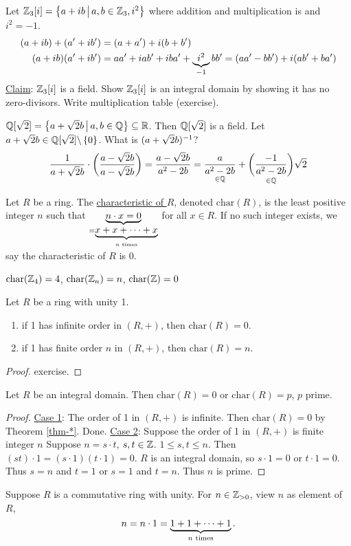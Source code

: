 \documentclass[]{article}
\begin{document}
\begin{example}
	Let $\mb Z_3[i]=\setm{a+ib}{a,b\in\mb Z_3,i^2}$ where addition and multiplication is  and $i^2=-1$.
	\begin{align*}
		(a+ib)+(a'+ib') &= (a+a')+i(b+b') \\
		(a+ib)(a'+ib') &= aa'+iab'+iba'+\ub{-1}{i^2}bb' = (aa'-bb')+i(ab'+ba')
	\end{align*}
	\ul{Claim}: $\mb Z_3[i]$ is a field.
	Show $\mb Z_3[i]$ is an integral domain by showing it has no zero-divisors. Write multiplication table (exercise).
\end{example}
\begin{example}
	$\mb Q[\sqrt2] = \setm{a+\sqrt2b}{a,b\in\mb Q}\subseteq\mb R$.
	Then $\mb Q[\sqrt2]$ is a field.
	Let $a+\sqrt2b\in\mb Q[\sqrt2]\bs\set0$. What is $(a+\sqrt2b)\inv$?
	$$ \frac1{a+\sqrt2b}\cdot\plr{\frac{a-\sqrt2b}{a-\sqrt2b}} = \frac{a-\sqrt2b}{a^2-2b} = \us{\in\mb Q}{\frac a{a^2-2b}} + \us{\in\mb Q}{\plr{\frac{-1}{a^2-2b}}}\sqrt2 $$
\end{example}
\begin{definition}
	Let $R$ be a ring. The \ul{characteristic of $R$}, denoted $\text{char}(R)$, is the least positive integer $n$ such that $\ub{=\ub{n\text{ times}}{x+x+\dots+x}}{n\cdot x=0}$ for all $x\in R$.
	If no such integer exists, we say the characteristic of $R$ is 0.
\end{definition}
\begin{example}
	$\text{char}(\mb Z_4)=4$, $\text{char}(\mb Z_n)=n$, $\text{char}(\mb Z)=0$
\end{example}
\begin{theorem}
	\label{thm-*}
	Let $R$ be a ring with unity 1.
	\begin{enumerate}
		\item if 1 has infinite order in $(R,+)$, then $\text{char}(R)=0$.
		\item if 1 has finite order $n$ in $(R,+)$, then $\text{char}(R)=n$.
	\end{enumerate}
\end{theorem}
\begin{proof}
	exercise.
\end{proof}
\begin{theorem}
	Let $R$ be an integral domain. Then $\text{char}(R)=0$ or $\text{char}(R)=p$, $p$ prime.
\end{theorem}
\begin{proof}
	\ul{Case 1}: The order of 1 in $(R,+)$ is infinite. Then $\text{char}(R)=0$ by Theorem \ref{thm-*}. Done.
	\ul{Case 2}: Suppose the order of 1 in $(R,+)$ is finite integer $n$
	Suppose $n=s\cdot t$, $s,t\in\mb Z$. $1\leq s,t\leq n$.
	Then $(st)\cdot1=(s\cdot1)(t\cdot 1)=0$. $R$ is an integral domain, so $s\cdot1=0$ or $t\cdot1=0$.
	Thus $s=n$ and $t=1$ or $s=1$ and $t=n$. Thus $n$ is prime.
\end{proof}
Suppose $R$ is a commutative ring with unity. For $n\in\mb Z_{>0}$, view $n$ as element of $R$, $$n=n\cdot 1=\ub{n\text{ times}}{1+1+\dots+1}.$$
\end{document}

